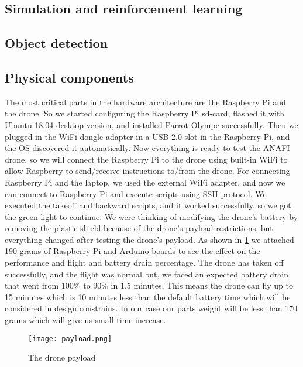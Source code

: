 \documentclass[../main.tex]{subfiles}
\begin{document}
\subsection{Simulation and reinforcement learning}

\lipsum[1]

\subsection{Object detection}

\lipsum[1]

\subsection{Physical components}
The most critical parts in the hardware architecture are the Raspberry Pi and the drone. So we started configuring the Raspberry Pi sd-card, flashed it with Ubuntu 18.04 desktop version, and installed Parrot Olympe successfully. Then we plugged in the WiFi dongle adapter in a USB 2.0 slot in the Raspberry Pi, and the OS discovered it automatically. Now everything is ready to test the  \textsc{ANAFI} drone, so we will connect the Raspberry Pi to the drone using built-in WiFi to allow Raspberry to send/receive instructions to/from the drone. For connecting Raspberry Pi and the laptop, we used the external WiFi adapter, and now we can connect to Raspberry Pi and execute scripts using SSH protocol. We executed the takeoff and backward scripts, and it worked successfully, so we got the green light to continue. We were thinking of modifying the drone's battery by removing the plastic shield because of the drone's payload restrictions, but everything changed after testing the drone's payload. As shown in \cref{fig:payload} we attached 190 grams of Raspberry Pi and Arduino boards to see the effect on the performance and flight and battery drain percentage. The drone has taken off successfully, and the flight was normal but, we faced an expected battery drain that went from 100\% to 90\% in 1.5 minutes, This means the drone can fly up to 15 minutes which is 10 minutes less than the default battery time which will be considered in design constrains. In our case our parts weight will be less than 170 grams which will give us small time increase.

\begin{figure}[bt]
	\centering
	\texttt{[image: payload.png]}
	\caption{The drone payload}
	\label{fig:payload}
\end{figure}  
\end{document}

